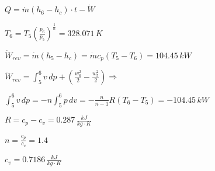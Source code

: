 \( Q = \dot{m} (h_6 - h_c) \cdot t - \dot{W} \)  

\( T_6 = T_5 \left( \frac{p_6}{p_5} \right)^{\frac{1}{n}} = 328.071 \, K \)  

\( \dot{W}_{rev} = \dot{m} (h_5 - h_c) = \dot{m} c_p (T_5 - T_6) = 104.45 \, kW \)  

\( \dot{W}_{rev} = \int_5^6 v \, dp + \left( \frac{w_6^2}{2} - \frac{w_5^2}{2} \right) \Rightarrow \)  

\( \int_5^6 v \, dp = -n \int_5^6 p \, dv = -\frac{n}{n-1} R (T_6 - T_5) = -104.45 \, kW \)  

\( R = c_p - c_v = 0.287 \, \frac{kJ}{kg \cdot K} \)  

\( n = \frac{c_p}{c_v} = 1.4 \)  

\( c_v = 0.7186 \, \frac{kJ}{kg \cdot K} \)